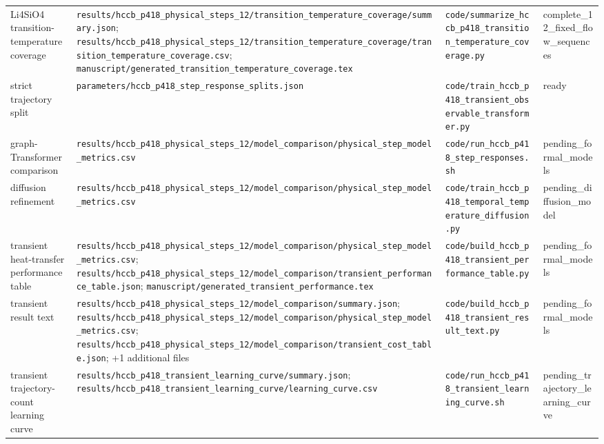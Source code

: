 \begin{longtable}{>{\raggedright\arraybackslash}p{2.8cm}>{\raggedright\arraybackslash}p{6.6cm}>{\raggedright\arraybackslash}p{6.4cm}>{\raggedright\arraybackslash}p{2.4cm}}
Li4SiO4 transition-temperature coverage & \nolinkurl{results/hccb_p418_physical_steps_12/transition_temperature_coverage/summary.json}; \nolinkurl{results/hccb_p418_physical_steps_12/transition_temperature_coverage/transition_temperature_coverage.csv}; \nolinkurl{manuscript/generated_transition_temperature_coverage.tex} & \nolinkurl{code/summarize_hccb_p418_transition_temperature_coverage.py} & complete\_\allowbreak{}12\_\allowbreak{}fixed\_\allowbreak{}flow\_\allowbreak{}sequences \\
strict trajectory split & \nolinkurl{parameters/hccb_p418_step_response_splits.json} & \nolinkurl{code/train_hccb_p418_transient_observable_transformer.py} & ready \\
graph-Transformer comparison & \nolinkurl{results/hccb_p418_physical_steps_12/model_comparison/physical_step_model_metrics.csv} & \nolinkurl{code/run_hccb_p418_step_responses.sh} & pending\_\allowbreak{}formal\_\allowbreak{}models \\
diffusion refinement & \nolinkurl{results/hccb_p418_physical_steps_12/model_comparison/physical_step_model_metrics.csv} & \nolinkurl{code/train_hccb_p418_temporal_temperature_diffusion.py} & pending\_\allowbreak{}diffusion\_\allowbreak{}model \\
transient heat-transfer performance table & \nolinkurl{results/hccb_p418_physical_steps_12/model_comparison/physical_step_model_metrics.csv}; \nolinkurl{results/hccb_p418_physical_steps_12/model_comparison/transient_performance_table.json}; \nolinkurl{manuscript/generated_transient_performance.tex} & \nolinkurl{code/build_hccb_p418_transient_performance_table.py} & pending\_\allowbreak{}formal\_\allowbreak{}models \\
transient result text & \nolinkurl{results/hccb_p418_physical_steps_12/model_comparison/summary.json}; \nolinkurl{results/hccb_p418_physical_steps_12/model_comparison/physical_step_model_metrics.csv}; \nolinkurl{results/hccb_p418_physical_steps_12/model_comparison/transient_cost_table.json}; +1 additional files & \nolinkurl{code/build_hccb_p418_transient_result_text.py} & pending\_\allowbreak{}formal\_\allowbreak{}models \\
transient trajectory-count learning curve & \nolinkurl{results/hccb_p418_transient_learning_curve/summary.json}; \nolinkurl{results/hccb_p418_transient_learning_curve/learning_curve.csv} & \nolinkurl{code/run_hccb_p418_transient_learning_curve.sh} & pending\_\allowbreak{}trajectory\_\allowbreak{}learning\_\allowbreak{}curve \\

\end{longtable}
